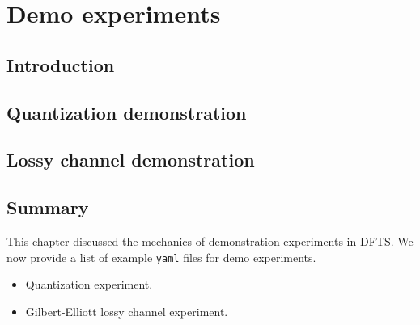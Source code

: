 \chapter{Demo experiments}\label{chapt:demo}

\section{Introduction}

\section{Quantization demonstration}


\section{Lossy channel demonstration}

\section{Summary}
This chapter discussed the mechanics of demonstration experiments in DFTS. We now provide a list of example \verb|yaml| files for demo experiments.

\begin{itemize}
	\item Quantization experiment.
	\item Gilbert-Elliott lossy channel experiment.
\end{itemize}
